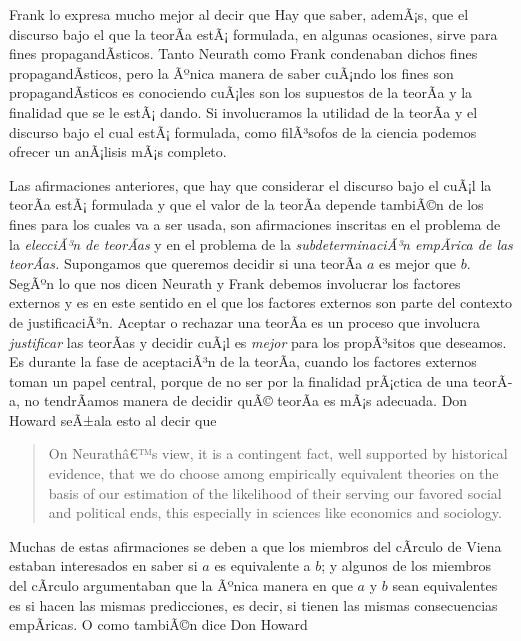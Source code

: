 Frank lo expresa mucho mejor al decir que  \parencite[p.~4]{Frank1956}
Hay que saber, ademÃ¡s, que el discurso bajo el que la teorÃ­a estÃ¡ formulada, en algunas ocasiones, sirve para fines propagandÃ­sticos.
Tanto Neurath como Frank condenaban dichos fines propagandÃ­sticos, pero la Ãºnica manera de saber cuÃ¡ndo los fines son propagandÃ­sticos es conociendo cuÃ¡les son los supuestos de la teorÃ­a y la finalidad que se le estÃ¡ dando.
Si involucramos la utilidad de la teorÃ­a y el discurso bajo el cual estÃ¡ formulada, como filÃ³sofos de la ciencia podemos ofrecer un anÃ¡lisis mÃ¡s completo.

Las afirmaciones anteriores, que hay que considerar el discurso bajo el cuÃ¡l la teorÃ­a estÃ¡ formulada y que el valor de la teorÃ­a depende tambiÃ©n de los fines para los cuales va a ser usada, son afirmaciones inscritas en el problema de la \emph{elecciÃ³n de teorÃ­as} y en el problema de la \emph{subdeterminaciÃ³n empÃ­rica de las teorÃ­as.}
Supongamos que queremos decidir si una teorÃ­a $a$ es mejor que $b$. 
SegÃºn lo que nos dicen Neurath y Frank debemos involucrar los factores externos y es en este sentido en el que los factores externos son parte del contexto de justificaciÃ³n.
Aceptar o rechazar una teorÃ­a es un proceso que involucra \emph{justificar} las teorÃ­as y decidir cuÃ¡l es \emph{mejor} para los propÃ³sitos que deseamos.
Es durante la fase de aceptaciÃ³n de la teorÃ­a, cuando los factores externos toman un papel central, porque de no ser por la finalidad prÃ¡ctica de una teorÃ­a, no tendrÃ­amos manera de decidir quÃ© teorÃ­a es mÃ¡s adecuada.
Don Howard seÃ±ala esto al decir que 

\begin{quote}
	On Neurathâ€™s view, it is a contingent fact, well supported by historical evidence, that we do choose among empirically equivalent theories on the basis of our estimation of the likelihood of their serving our favored social and political ends, this especially in sciences like economics and sociology. \parencite[p.~5]{Howard2006}
\end{quote}

Muchas de estas afirmaciones se deben a que los miembros del cÃ­rculo de Viena estaban interesados en saber si $a$ es equivalente a $b$;
y algunos de los miembros del cÃ­rculo argumentaban que la Ãºnica manera en que $a$ y $b$ sean equivalentes es si hacen las mismas predicciones, es decir, si tienen las mismas consecuencias empÃ­ricas.
O como tambiÃ©n dice Don Howard

